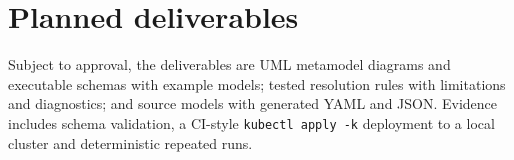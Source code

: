 \section{Planned deliverables}

Subject to approval, the deliverables are UML metamodel diagrams and executable
schemas with example models; tested resolution rules with limitations and
diagnostics; and source models with generated YAML and JSON. Evidence includes
schema validation, a CI-style \texttt{kubectl apply -k} deployment to a local
cluster and deterministic repeated runs.
